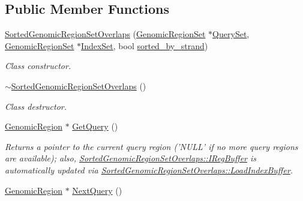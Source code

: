 \subsection*{Public Member Functions}
\begin{DoxyCompactItemize}
\item 
\hyperlink{classSortedGenomicRegionSetOverlaps_a0213f6ea908db759f63cea80db4909aa}{SortedGenomicRegionSetOverlaps} (\hyperlink{classGenomicRegionSet}{GenomicRegionSet} $\ast$\hyperlink{classGenomicRegionSetOverlaps_ae513304379055f6d379bc5907733dbe2}{QuerySet}, \hyperlink{classGenomicRegionSet}{GenomicRegionSet} $\ast$\hyperlink{classGenomicRegionSetOverlaps_ac587bf854c827381493735b473622e03}{IndexSet}, bool \hyperlink{classSortedGenomicRegionSetOverlaps_af08c449faa6ba7be7c6ed9c07f4226e3}{sorted\_\-by\_\-strand})
\begin{DoxyCompactList}\small\item\em Class constructor. \end{DoxyCompactList}\item 
\hypertarget{classSortedGenomicRegionSetOverlaps_a1ac0a70899fce3684da0b7e915a13d1e}{
\hyperlink{classSortedGenomicRegionSetOverlaps_a1ac0a70899fce3684da0b7e915a13d1e}{$\sim$SortedGenomicRegionSetOverlaps} ()}
\label{classSortedGenomicRegionSetOverlaps_a1ac0a70899fce3684da0b7e915a13d1e}

\begin{DoxyCompactList}\small\item\em Class destructor. \end{DoxyCompactList}\item 
\hypertarget{classSortedGenomicRegionSetOverlaps_a3b187db0a12f876a9347b4a1641670a0}{
\hyperlink{classGenomicRegion}{GenomicRegion} $\ast$ \hyperlink{classSortedGenomicRegionSetOverlaps_a3b187db0a12f876a9347b4a1641670a0}{GetQuery} ()}
\label{classSortedGenomicRegionSetOverlaps_a3b187db0a12f876a9347b4a1641670a0}

\begin{DoxyCompactList}\small\item\em Returns a pointer to the current query region ('NULL' if no more query regions are available); also, \hyperlink{classSortedGenomicRegionSetOverlaps_a19fa18e6abd9f045786698fff48a445f}{SortedGenomicRegionSetOverlaps::IRegBuffer} is automatically updated via \hyperlink{classSortedGenomicRegionSetOverlaps_ad894d118c61c3cd11be8b37b8f185120}{SortedGenomicRegionSetOverlaps::LoadIndexBuffer}. \end{DoxyCompactList}\item 
\hypertarget{classSortedGenomicRegionSetOverlaps_a127edf3e9d8fb2ebf189af00e6893e96}{
\hyperlink{classGenomicRegion}{GenomicRegion} $\ast$ \hyperlink{classSortedGenomicRegionSetOverlaps_a127edf3e9d8fb2ebf189af00e6893e96}{NextQuery} ()}
\label{classSortedGenomicRegionSetOverlaps_a127edf3e9d8fb2ebf189af00e6893e96}


\end{DoxyCompactItemize}
